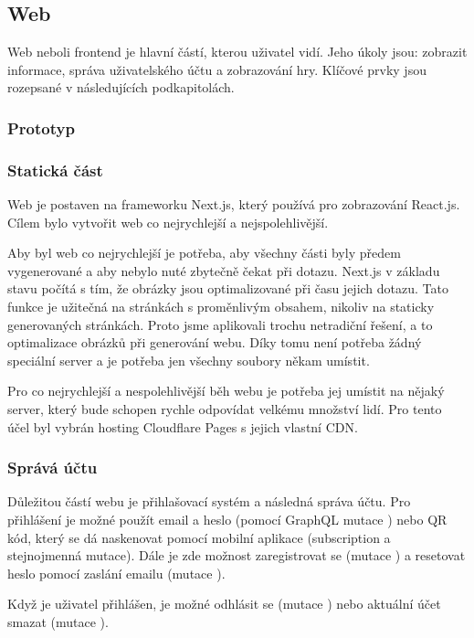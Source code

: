 \subsection{Web}
Web neboli frontend je hlavní částí, kterou uživatel vidí. Jeho úkoly jsou: zobrazit informace, správa uživatelského účtu a zobrazování hry. Klíčové prvky jsou rozepsané v následujících podkapitolách.

\subsubsection{Prototyp}

\subsubsection{Statická část}
Web je postaven na frameworku Next.js, který používá pro zobrazování React.js. Cílem bylo vytvořit web co nejrychlejší a nejspolehlivější.\par
Aby byl web co nejrychlejší je potřeba, aby všechny části byly předem vygenerované a aby nebylo nuté zbytečně čekat při dotazu. Next.js v základu stavu počítá s tím, že obrázky jsou optimalizované při času jejich dotazu. Tato funkce je užitečná na stránkách s proměnlivým obsahem, nikoliv na staticky generovaných stránkách. Proto jsme aplikovali trochu netradiční řešení, a to optimalizace obrázků při generování webu. Díky tomu není potřeba žádný speciální server a je potřeba jen všechny soubory někam umístit.\par
Pro co nejrychlejší a nespolehlivější běh webu je potřeba jej umístit na nějaký server, který bude schopen rychle odpovídat velkému množství lidí. Pro tento účel byl vybrán hosting Cloudflare Pages\cite{Cloudflare-pages} s jejich vlastní CDN\cite{Cloudflare-cdn}. 

\subsubsection{Správá účtu}
Důležitou částí webu je přihlašovací systém a následná správa účtu. Pro přihlášení je možné použít email a heslo (pomocí GraphQL mutace ) nebo QR kód, který se dá naskenovat pomocí mobilní aplikace (subscription  a stejnojmenná mutace). Dále je zde možnost zaregistrovat se (mutace ) a resetovat heslo pomocí zaslání emailu (mutace ).\par
Když je uživatel přihlášen, je možné odhlásit se (mutace ) nebo aktuální účet smazat (mutace ).


